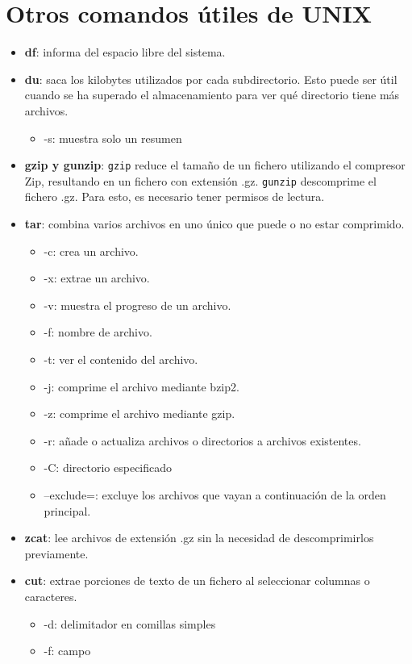 \section{Otros comandos útiles de UNIX}
\begin{itemize}
\item \textbf{df}: informa del espacio libre del sistema.

\item \textbf{du}: saca los kilobytes utilizados por cada subdirectorio. Esto puede ser útil cuando se ha superado el almacenamiento para ver qué directorio tiene más archivos. \begin{itemize}
\item -s: muestra solo un resumen
\end{itemize}

\item \textbf{gzip y gunzip}: \texttt{gzip} reduce el tamaño de un fichero utilizando el compresor Zip, resultando en un fichero con extensión .gz. \texttt{gunzip} descomprime el fichero .gz. Para esto, es necesario tener permisos de lectura.

\item \textbf{tar}: combina varios archivos en uno único que puede o no estar comprimido. \begin{itemize}
\item -c: crea un archivo.
\item -x: extrae un archivo.
\item -v: muestra el progreso de un archivo.
\item -f: nombre de archivo.
\item -t: ver el contenido del archivo.
\item -j: comprime el archivo mediante bzip2.
\item -z: comprime el archivo mediante gzip.
\item -r: añade o actualiza archivos o directorios a archivos existentes.
\item -C: directorio especificado
\item --exclude=: excluye los archivos que vayan a continuación de la orden principal. 
\end{itemize}

\item \textbf{zcat}: lee archivos de extensión .gz sin la necesidad de descomprimirlos previamente. 

\item \textbf{cut}: extrae porciones de texto de un fichero al seleccionar columnas o caracteres. \begin{itemize}
\item -d: delimitador en comillas simples
\item -f: campo
\end{itemize}
 

\end{itemize}
